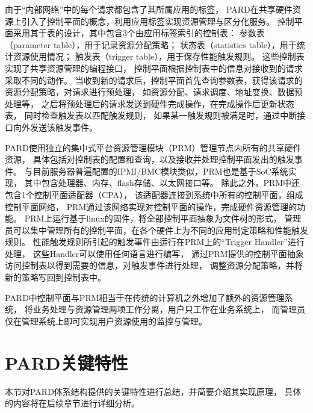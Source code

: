 由于``内部网络''中的每个请求都包含了其所属应用的标签，
PARD在共享硬件资源上引入了控制平面的概念，利用应用标签实现资源管理与区分化服务。
控制平面采用其于表的设计，其中包含3个由应用标签索引的控制表：
参数表（parameter table），用于记录资源分配策略；
状态表（statistics table），用于统计资源使用情况；
触发表（trigger table），用于保存性能触发规则。
这些控制表实现了共享资源管理的编程接口，
控制平面根据控制表中的信息对接收到的请求采取不同的动作。
当收到新的请求后，控制平面首先查询参数表，获得该请求的资源分配策略，对请求进行预处理，
如资源分配、请求调度、地址变换、数据预处理等，
之后将预处理后的请求发送到硬件完成操作，在完成操作后更新状态表，
同时检查触发表以匹配触发规则，
如果某一触发规则被满足时，通过中断接口向外发送该触发事件。

PARD使用独立的集中式平台资源管理模块（PRM）管理节点内所有的共享硬件资源，
具体包括对控制表的配置和查询，以及接收并处理控制平面发出的触发事件。
与目前服务器普遍配置的IPMI/BMC模块类似，PRM也是基于SoC系统实现，
其中包含处理器、内存、flash存储、以太网接口等。
除此之外，PRM中还包含1个控制平面适配器（CPA），
该适配器连接到系统中所有的控制平面，组成控制平面网络，
PRM通过该网络实现对控制平面的操作，完成硬件资源管理的功能。
PRM上运行基于linux的固件，将全部控制平面抽象为文件树的形式，
管理员可以集中管理所有的控制平面，在各个硬件上为不同的应用制定策略和性能触发规则。
性能触发规则所引起的触发事件由运行在PRM上的``Trigger Handler''进行处理，
这些Handler可以使用任何语言进行编写，
通过PRM提供的控制平面抽象访问控制表以得到需要的信息，对触发事件进行处理，
调整资源分配策略，并将新的策略写回到控制表中。

PARD中控制平面与PRM相当于在传统的计算机之外增加了额外的资源管理系统，
将业务处理与资源管理两项工作分离，用户只工作在业务系统上，
而管理员仅在管理系统上即可实现用户资源使用的监控与管理。


\section{PARD关键特性}

本节对PARD体系结构提供的关键特性进行总结，并简要介绍其实现原理，
具体的内容将在后续章节进行详细分析。

